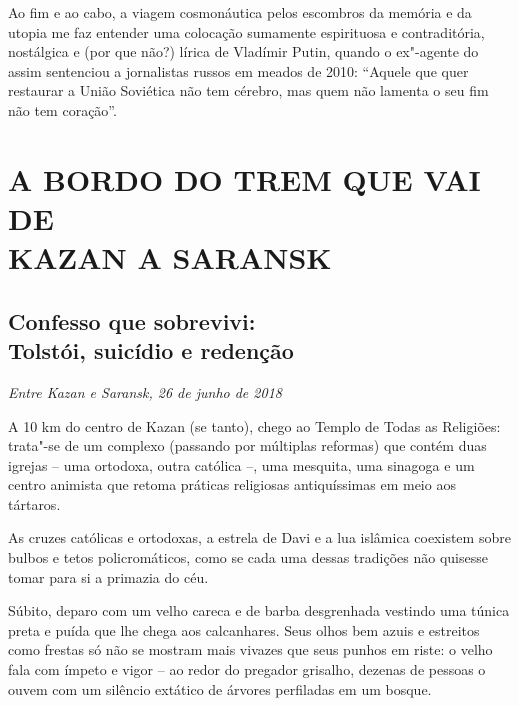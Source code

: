 Ao fim e ao cabo, a viagem cosmonáutica pelos escombros da memória e da
utopia me faz entender uma colocação sumamente espirituosa e
contraditória, nostálgica e (por que não?) lírica de Vladímir Putin,
quando o ex"-agente do  assim sentenciou a jornalistas russos em
meados de 2010: ``Aquele que quer restaurar a União Soviética não tem
cérebro, mas quem não lamenta o seu fim não tem coração''.

\clearpage{\pagestyle{empty}\cleardoublepage}
\movetooddpage
{}
\part*{A BORDO DO TREM QUE VAI DE\\KAZAN A SARANSK}

\chapter*{Confesso que sobrevivi:\\Tolstói, suicídio e redenção}

\begin{flushright}
\emph{Entre Kazan e Saransk, 26 de junho de 2018}
\end{flushright}

A 10 km do centro de Kazan (se tanto), chego ao Templo de Todas as
Religiões: trata"-se de um complexo (passando por múltiplas reformas) que
contém duas igrejas -- uma ortodoxa, outra católica --, uma mesquita,
uma sinagoga e um centro animista que retoma práticas religiosas
antiquíssimas em meio aos tártaros.

As cruzes católicas e ortodoxas, a estrela de Davi e a lua islâmica
coexistem sobre bulbos e tetos policromáticos, como se cada uma dessas
tradições não quisesse tomar para si a primazia do céu.

Súbito, deparo com um velho careca e de barba desgrenhada vestindo uma
túnica preta e puída que lhe chega aos calcanhares. Seus olhos bem azuis
e estreitos como frestas só não se mostram mais vivazes que seus punhos
em riste: o velho fala com ímpeto e vigor -- ao redor do pregador
grisalho, dezenas de pessoas o ouvem com um silêncio extático de árvores
perfiladas em um bosque.

